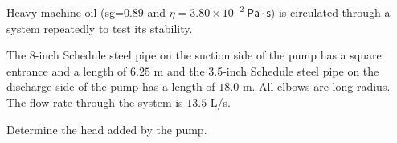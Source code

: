 \documentclass[10pt]{amsart}
\begin{document}
\begin{multicols}{2}
	Heavy machine oil (sg=$0.89$ and $\eta=3.80\times10^{-2}\mathsf{\ Pa\cdot s}$) is circulated through a system repeatedly to test its stability. \par\medskip
	The 8-inch Schedule steel pipe on the suction side of the pump has a square entrance and a length of $6.25$ m and the
	3.5-inch Schedule steel pipe on the discharge side of the pump has a length of $18.0$ m. All elbows are long
	radius. The flow rate through the system is $13.5$ L/s. \par\medskip
	Determine the head added by the pump. \par\medskip
	\columnbreak
	
\end{multicols}
\end{document}

